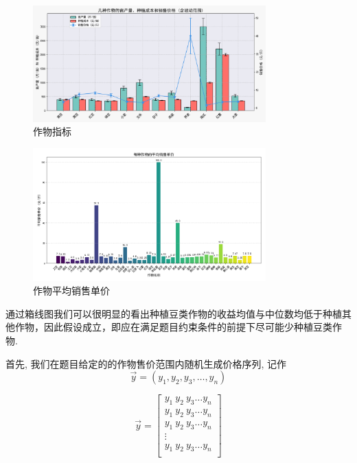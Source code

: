 \documentclass[12pt]{ctexart}
\begin{document}
\begin{enumerate}[(1)]
	
\begin{figure}[h]
	\centering
	\includegraphics[width=0.8\textwidth]{image13.png}  %
	\caption{作物指标}
	\label{fig:yield_comparison1}
\end{figure}

\begin{figure}[h]
	\centering
	\includegraphics[width=0.8\textwidth]{image14.png}  %
	\caption{作物平均销售单价}
	\label{fig:yield_comparison2}
\end{figure}





	通过箱线图我们可以很明显的看出种植豆类作物的收益均值与中位数均低于种植其他作物，因此假设成立，即应在满足题目约束条件的前提下尽可能少种植豆类作物.

	
	
	首先, 我们在题目给定的的作物售价范围内随机生成价格序列, 记作
 	\begin{equation*}\vec{y}=\left(y_1, y_2, y_3, \ldots, y_n\right)
	\end{equation*}
	
	\begin{equation} %
		\vec{y} =
		\begin{bmatrix}
			y_1 \ y_2 \ y_3 \ldots y_n\\
			y_1 \ y_2 \ y_3 \ldots y_n\\
			y_1 \ y_2 \ y_3 \ldots y_n\\
			\vdots \\
			y_1 \ y_2 \ y_3 \ldots y_n\\
		\end{bmatrix}
		\label{列向量公式}
	\end{equation}
	

\end{enumerate}
\end{document}
